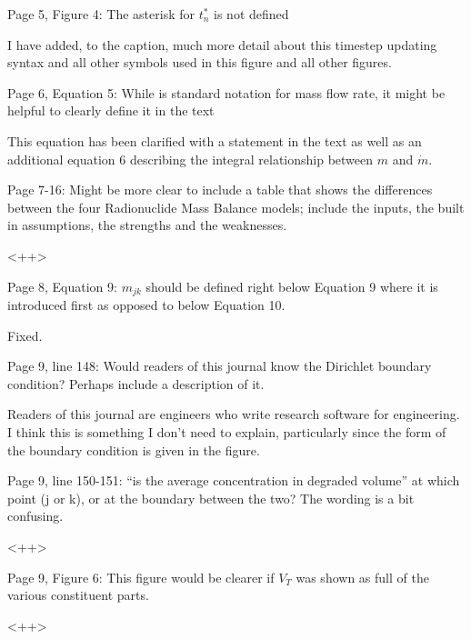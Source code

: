 \documentclass[answers,12pt]{exam}
\begin{document}
\begin{questions}
\question Page 5, Figure 4: The asterisk for $t^*_n$ is not defined 
\begin{solution}
I have added, to the caption, much more detail about this timestep updating 
        syntax and all other symbols used in this figure and all other figures. 
\end{solution} 


\question Page  6,  Equation  5: While   is standard notation for mass flow rate, it might be helpful to clearly define 
it in the text 
\begin{solution}
This equation has been clarified with a statement in the text as well as an 
        additional equation 6 describing the integral relationship between $m$ 
        and $\dot{m}$.
\end{solution} 
 
\question Page  7-16:  Might  be  more  clear  to  include  a  table  that  shows  the  differences  between  the  four 
Radionuclide  Mass  Balance  models;  include  the  inputs,  the  built  in  assumptions,  the  strengths  and  the 
weaknesses. 
\begin{solution}
<++>
\end{solution} 
 
\question Page  8,  Equation  9:  $m_{jk}$  should be defined right below Equation 9 where it is introduced first as opposed 
to below Equation 10. 
\begin{solution}
Fixed.
\end{solution} 
 
\question Page  9, line 148: Would readers of this journal know the Dirichlet boundary condition? Perhaps include a 
description of it. 
\begin{solution}
Readers of this journal are engineers who write research software for 
        engineering. I think this is something I don't need to explain, 
        particularly since the form of the boundary condition is given in the 
        figure.
\end{solution} 
 
\question Page  9,  line  150-151:  ``is  the  average  concentration in degraded volume'' at which point (j or k), or at the 
boundary between the two? The wording is a bit confusing.  
\begin{solution}
<++>
\end{solution} 
 
\question Page 9, Figure 6: This figure would be clearer if $V_T$ was shown as full of the various constituent parts. 
\begin{solution}
<++>
\end{solution} 
 

\end{questions}
\end{document}
